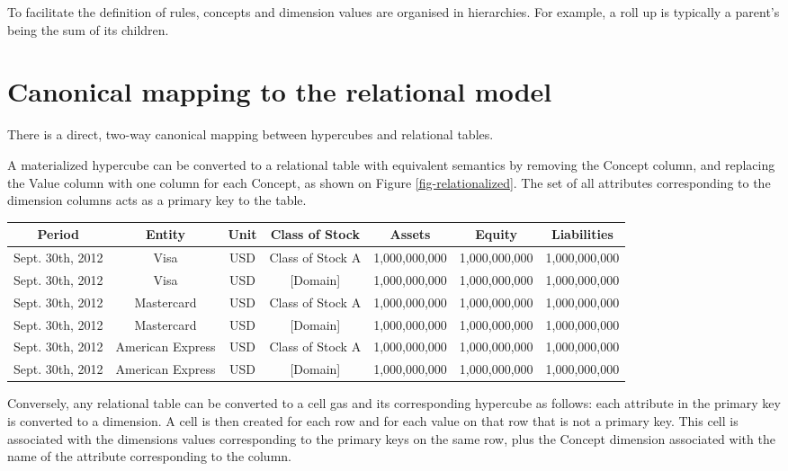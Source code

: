 \documentclass{vldb}
\begin{document}
To facilitate the definition of rules, concepts and dimension values are organised in hierarchies. For example, a roll up is typically a parent's being the sum of its children.

\section{Canonical mapping to the relational model}
\label{section-relational-mapping}
There is a direct, two-way canonical mapping between hypercubes and relational tables.

A materialized hypercube can be converted to a relational table with equivalent semantics by removing the Concept column, and replacing the Value column with one column for each Concept, as shown on Figure \ref{fig-relationalized}. The set of all attributes corresponding to the dimension columns acts as a primary key to the table.

\begin{figure*}
\caption{A relational table corresponding to a hypercube}
\label{fig-relationalized}
\begin{tabular}{|c|c|c|c||c|c|c|}
\hline
Period & Entity & Unit & Class of Stock & Assets & Equity & Liabilities \\
\hline
Sept. 30th, 2012 & Visa & USD & Class of Stock A & 1,000,000,000 & 1,000,000,000 & 1,000,000,000 \\
Sept. 30th, 2012 & Visa & USD & [Domain] & 1,000,000,000 & 1,000,000,000 & 1,000,000,000 \\

Sept. 30th, 2012 & Mastercard & USD & Class of Stock A & 1,000,000,000 & 1,000,000,000 & 1,000,000,000 \\

Sept. 30th, 2012 & Mastercard & USD & [Domain] & 1,000,000,000 & 1,000,000,000 & 1,000,000,000 \\

Sept. 30th, 2012 & American Express & USD & Class of Stock A & 1,000,000,000 & 1,000,000,000 & 1,000,000,000 \\

Sept. 30th, 2012 & American Express & USD & [Domain] & 1,000,000,000 & 1,000,000,000 & 1,000,000,000 \\

\hline
\end{tabular}
\end{figure*}

Conversely, any relational table can be converted to a cell gas and its corresponding hypercube as follows: each attribute in the primary key is converted to a dimension. A cell is
then created for each row and for each value on that row that is not a primary key. This cell is associated with the dimensions values corresponding to the primary keys on the same row, plus the Concept dimension associated with the name of the attribute corresponding to the column.
\end{document}
